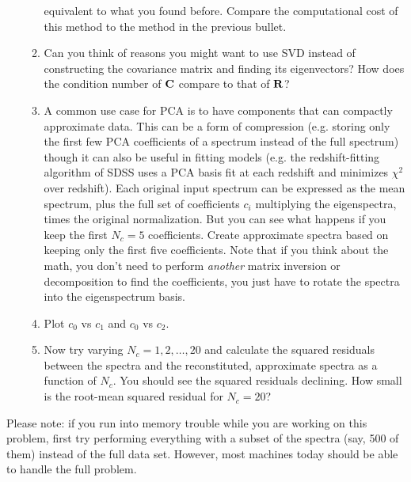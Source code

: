 \documentclass[11pt, preprint]{aastex}
\begin{document}
\begin{enumerate}
\begin{enumerate}
       equivalent to what you found before. Compare the computational
       cost of this method to the method in the previous bullet.
    \item Can you think of reasons you might want to use SVD instead
      of constructing the covariance matrix and finding its
      eigenvectors? How does the condition number of ${\bf C}$ compare
      to that of ${\bf R}$?
     \item A common use case for PCA is to have components that can
       compactly approximate data. This can be a form of compression
       (e.g. storing only the first few PCA coefficients of a spectrum
       instead of the full spectrum) though it can also be useful in
       fitting models (e.g. the redshift-fitting algorithm of SDSS
       uses a PCA basis fit at each redshift and minimizes $\chi^2$
       over redshift). Each original input spectrum can be expressed
       as the mean spectrum, plus the full set of coefficients $c_i$
       multiplying the eigenspectra, times the original
       normalization. But you can see what happens if you keep the
       first $N_c=5$ coefficients. Create approximate spectra based on
       keeping only the first five coefficients. Note that if you
       think about the math, you don't need to perform {\it another}
       matrix inversion or decomposition to find the coefficients, you
       just have to rotate the spectra into the eigenspectrum basis.
     \item Plot $c_0$ vs $c_1$ and $c_0$ vs $c_2$.
     \item Now try varying $N_c =1,2,\ldots, 20$ and calculate the
       squared residuals between the spectra and the
       reconstituted, approximate spectra as a function of $N_c$. You
       should see the squared residuals declining. How small is the
       root-mean squared residual for $N_c =20$?
  \end{enumerate}
\end{enumerate}

Please note: if you run into memory trouble while you are working on
this problem, first try performing everything with a subset of the
spectra (say, 500 of them) instead of the full data set. However, most
machines today should be able to handle the full problem. 
\end{document}
